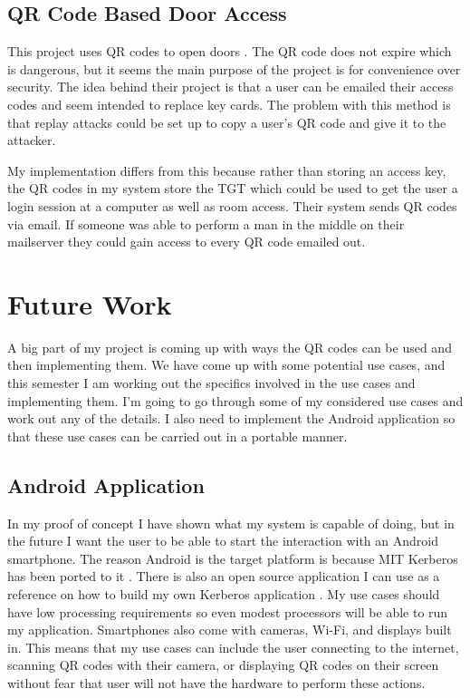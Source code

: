 \documentclass[]{report}   %
\begin{document}
\subsection{QR Code Based Door Access}
This project uses QR codes to open doors \cite{QRRelated}. The QR code does not expire which is dangerous, but it seems the main purpose of the project is for convenience over security. The idea behind their project is that a user can be emailed their access codes and seem intended to replace key cards. The problem with this method is that replay attacks could be set up to copy a user's QR code and give it to the attacker.

My implementation differs from this because rather than storing an access key, the QR codes in my system store the TGT which could be used to get the user a login session at a computer as well as room access. Their system sends QR codes via email. If someone was able to perform a man in the middle on their mailserver they could gain access to every QR code emailed out.


\section{Future Work}
A big part of my project is coming up with ways the QR codes can be used and then implementing them. We have come up with some potential use cases, and this semester I am working out the specifics involved in the use cases and implementing them. I’m going to go through some of my considered use cases and work out any of the details. I also need to implement the Android application so that these use cases can be carried out in a portable manner.

\subsection{Android Application}
In my proof of concept I have shown what my system is capable of doing, but in the future I want the user to be able to start the interaction with an Android smartphone. The reason Android is the target platform is because MIT Kerberos has been ported to it \cite{KerbDroid}. There is also an open source application I can use as a reference on how to build my own Kerberos application \cite{KerbApp}. My use cases should have low processing requirements so even modest processors will be able to run my application. Smartphones also come with cameras, Wi-Fi, and displays built in. This means that my use cases can include the user connecting to the internet, scanning QR codes with their camera, or displaying QR codes on their screen without fear that user will not have the hardware to perform these actions.
\end{document}
